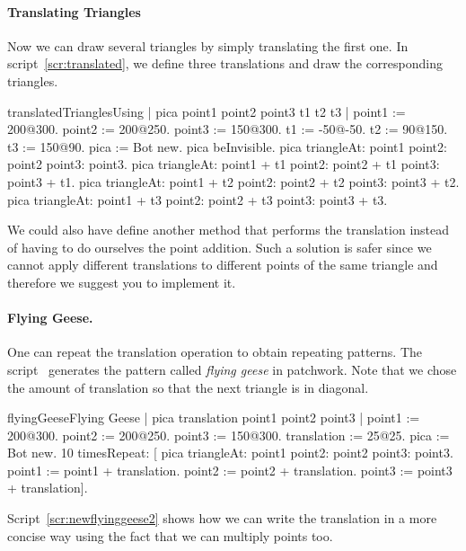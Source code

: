 \paragraph{Translating Triangles}
Now we can draw several triangles by simply translating the first one. In script~\ref{scr:translated}, we define three translations and draw the corresponding triangles. 

\begin{scriptfig}{translatedTriangles}{Using }\label{scr:translated}
| pica  point1 point2 point3 t1 t2 t3 |
point1 := 200@300.
point2 := 200@250.
point3 := 150@300.
t1 := -50@-50.
t2 := 90@150.
t3 := 150@90.
pica := Bot new.
pica beInvisible.
pica triangleAt: point1 point2: point2 point3: point3.
pica triangleAt: point1 + t1 point2: point2 + t1 
        point3: point3 + t1.
pica triangleAt: point1 + t2 point2: point2 + t2 
        point3: point3 + t2.
pica triangleAt: point1 + t3 point2: point2 + t3 
        point3: point3 + t3.
\end{scriptfig}

We could also have define another method  that performs the translation instead of having to do ourselves the point addition. Such a solution is safer since we cannot apply different translations to different points of the same triangle and therefore we suggest you to implement it. 

\paragraph{Flying Geese.}
One can repeat the translation operation to obtain repeating patterns. The script~ generates the pattern called \emph{flying
geese} in patchwork. Note that  we chose the amount of translation so that the next triangle is in diagonal.

\begin{scriptfig}{flyingGeese}{Flying Geese}\label{scr:newflyinggeese}
| pica translation point1 point2 point3 |
point1 := 200@300.
point2 := 200@250.
point3 := 150@300.
translation := 25@25.
pica := Bot new.
10 timesRepeat: 
        [ pica triangleAt: point1 point2: point2 point3: point3.
        point1 := point1 + translation.
        point2 := point2 + translation.
        point3 := point3 + translation].
\end{scriptfig}


Script~\ref{scr:newflyinggeese2} shows how we can write the translation in a more concise way using the fact that we can multiply points too. 

